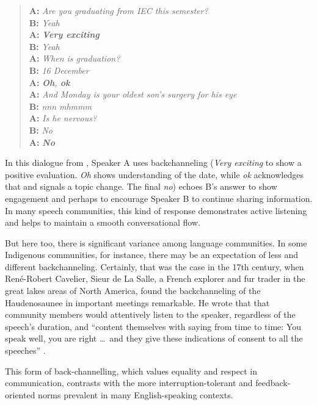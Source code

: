 \begin{quote}
    \textbf{A:} \textit{Are you graduating from IEC this semester?} \\
    \textbf{B:} \textit{Yeah} \\
    \textbf{A:} \textit{\textbf{Very exciting}} \\
    \textbf{B:} \textit{Yeah} \\
    \textbf{A:} \textit{When is graduation? }\\
    \textbf{B:} \textit{16 December} \\
    \textbf{A:} \textit{\textbf{Oh}, \textbf{ok} }\\
    \textbf{A:} \textit{And Monday is your oldest son's surgery for his eye} \\
    \textbf{B:} \textit{nnn mhmmm} \\
    \textbf{A:} \textit{Is he nervous?} \\
    \textbf{B:} \textit{No} \\
    \textbf{A:} \textit{\textbf{No}}
\end{quote}

In this dialogue from \citet[105]{ShelleyGonzalez2013}, Speaker A uses backchanneling (\textit{Very exciting} to show a positive evaluation. \textit{Oh} shows understanding of the date, while \textit{ok} acknowledges that and signals a topic change. The final \textit{no}) echoes B's answer to show engagement and perhaps to encourage Speaker B to continue sharing information. In many speech communities, this kind of response demonstrates active listening and helps to maintain a smooth conversational flow.

But here too, there is significant variance among language communities. In some Indigenous communities, for instance, there may be an expectation of less and different backchanneling. Certainly, that was the case in the 17th century, when René-Robert Cavelier, Sieur de La Salle, a French explorer and fur trader in the great lakes areas of North America, found the backchanneling of the Haudenosaunee in important meetings remarkable. He wrote that that community members would attentively listen to the speaker, regardless of the speech's duration, and ``content themselves with saying from time to time: You speak well, you are right \dots~and they give these indications of consent to all the speeches'' \citep[131]{duval2024}.

This form of back-channelling, which values equality and respect in communication, contrasts with the more interruption-tolerant and feedback-oriented norms prevalent in many English-speaking contexts.

